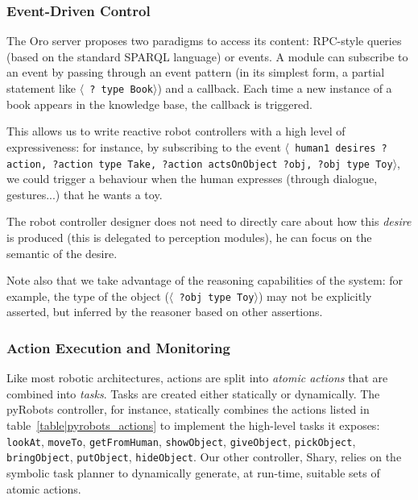 \documentclass[preprint,3p,times]{elsarticle}
\newcommand{\stmt}[1]{{\footnotesize \tt $\langle$ #1\relax$\rangle$}}
\begin{document}
\subsubsection{Event-Driven Control}

The {\sc Oro} server proposes two paradigms to access its content: RPC-style
queries (based on the standard SPARQL language) or events. A module can
subscribe to an event by passing through an event pattern (in its simplest
form, a partial statement like \stmt{? type Book}) and a callback.  Each
time a new instance of a book appears in the knowledge base, the callback is
triggered.

This allows us to write reactive robot controllers with a high level of
expressiveness: for instance, by subscribing to the event \stmt{human1 desires
?action, ?action type Take, ?action actsOnObject ?obj, ?obj type Toy}, we could trigger a
behaviour when the human expresses (through dialogue, gestures...) that he
wants a toy.

The robot controller designer does not need to directly care about how this
\emph{desire} is produced (this is delegated to perception modules), he can
focus on the semantic of the desire.

Note also that we take advantage of the reasoning capabilities of the system:
for example, the type of the object (\stmt{?obj type Toy}) may not be
explicitly asserted, but inferred by the reasoner based on other assertions.

\subsubsection{Action Execution and Monitoring}\label{sec:action}

Like most robotic architectures, actions are split into \emph{atomic actions}
that are combined into \emph{tasks}. Tasks are created either statically or dynamically.
The {\sc pyRobots} controller, for instance, statically combines the actions listed in
table~\ref{table|pyrobots_actions} to implement the high-level tasks it exposes: {\tt
lookAt}, {\tt moveTo}, {\tt getFromHuman}, {\tt showObject}, {\tt giveObject},
{\tt pickObject}, {\tt bringObject}, {\tt putObject}, {\tt hideObject}.
Our other controller, {\sc Shary}, relies on the symbolic task planner to
dynamically generate, at run-time, suitable sets of atomic actions.
\end{document}
